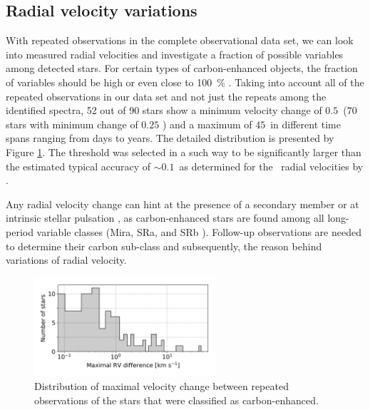 \subsection{Radial velocity variations}
\label{sec:binaries}
With repeated observations in the complete observational data set, we can look into measured radial velocities and investigate a fraction of possible variables among detected stars. For certain types of carbon-enhanced objects, the fraction of variables should be high or even close to 100~\% \citet{2016ApJ...826...85S}. Taking into account all of the repeated observations in our data set and not just the repeats among the identified spectra, 52 out of 90 stars show a minimum velocity change of $0.5$~\kms (70 stars with minimum change of $0.25$ \kms) and a maximum of $45$~\kms in different time spans ranging from days to years. The detailed distribution is presented by Figure \ref{fig:rv_rep_dist}. The threshold was selected in a such way to be significantly larger than the estimated typical accuracy of $\sim0.1$~\kms as determined for the \Gh\ radial velocities by \citet{2018arXiv180406344Z}.

Any radial velocity change can hint at the presence of a secondary member or at intrinsic stellar pulsation \cite{2002AA...390..987B, 2010JApA...31..177L, 2012A&A...544A..10B}, as carbon-enhanced stars are found among all long-period variable classes (Mira, SRa, and SRb  \cite{2013A&A...553A..93B, 2014A&A...568A.100B}). Follow-up observations are needed to determine their carbon sub-class and subsequently, the reason behind variations of radial velocity.

\begin{figure}
	\centering
	\includegraphics[width=0.6\textwidth]{rv_rep_dist.png}
	\caption{Distribution of maximal velocity change between repeated observations of the stars that were classified as carbon-enhanced.}
	\label{fig:rv_rep_dist}
\end{figure}

